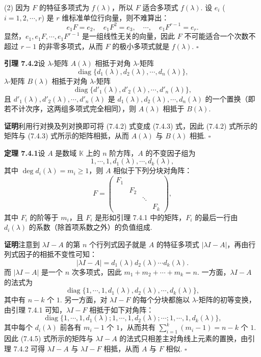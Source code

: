 \documentclass[UTF8,12pt,a4paper,fontset=fandol]{ctexart}
\begin{document}
(2) 因为 $F$ 的特征多项式为 $f(\lambda)$，所以 $F$ 适合多项式 $f(\lambda)$. 设 $e_i$ ($i=1,2,\cdots,r$) 是 $r$ 维标准单位行向量，则不难算出：
\[
e_1F=e_2,\quad e_1F^2=e_3,\quad \cdots,\quad e_1F^{r-1}=e_r.
\]
显然，$e_1,e_1F,\cdots,e_1F^{r-1}$ 是一组线性无关的向量，因此 $F$ 不可能适合一个次数不超过 $r-1$ 的非零多项式，从而 $F$ 的极小多项式就是 $f(\lambda)$. $\square$

\noindent\textbf{引理 7.4.2}\quad 设 $\lambda$-矩阵 $A(\lambda)$ 相抵于对角 $\lambda$-矩阵
\begin{equation}
\operatorname{diag}\{d_1(\lambda),d_2(\lambda),\cdots,d_n(\lambda)\},
\tag{7.4.2}
\end{equation}
$\lambda$-矩阵 $B(\lambda)$ 相抵于对角 $\lambda$-矩阵
\begin{equation}
\operatorname{diag}\{d'_1(\lambda),d'_2(\lambda),\cdots,d'_n(\lambda)\},
\tag{7.4.3}
\end{equation}
且 $d'_1(\lambda),d'_2(\lambda),\cdots,d'_n(\lambda)$ 是 $d_1(\lambda),d_2(\lambda),\cdots,d_n(\lambda)$ 的一个置换（即若不计次序，这两组多项式完全相同），则 $A(\lambda)$ 相抵于 $B(\lambda)$.

\noindent\textbf{证明}\quad 利用行对换及列对换即可将 (7.4.2) 式变成 (7.4.3) 式，因此 (7.4.2) 式所示的矩阵与 (7.4.3) 式所示的矩阵相抵，从而 $A(\lambda)$ 与 $B(\lambda)$ 相抵. $\square$

\noindent\textbf{定理 7.4.1}\quad 设 $A$ 是数域 $\mathbb{K}$ 上的 $n$ 阶方阵，$A$ 的不变因子组为
\[
1,\cdots,1,d_1(\lambda),\cdots,d_k(\lambda),
\]
其中 $\deg d_i(\lambda)=m_i\geq 1$，则 $A$ 相似于下列分块对角阵：
\begin{equation}
F=\left(\begin{array}{cccc}
F_1 & & & \\
& F_2 & & \\
& & \ddots & \\
& & & F_k
\end{array}\right),
\tag{7.4.4}
\end{equation}
其中 $F_i$ 的阶等于 $m_i$，且 $F_i$ 是形如引理 7.4.1 中的矩阵，$F_i$ 的最后一行由 $d_i(\lambda)$ 的系数（除首项系数之外）的负值组成.

\noindent\textbf{证明}\quad 注意到 $\lambda I-A$ 的第 $n$ 个行列式因子就是 $A$ 的特征多项式 $|\lambda I-A|$，再由行列式因子的相抵不变性可知：
\[
|\lambda I-A|=d_1(\lambda)d_2(\lambda)\cdots d_k(\lambda).
\]
而 $|\lambda I-A|$ 是一个 $n$ 次多项式，因此 $m_1+m_2+\cdots+m_k=n$. 一方面，$\lambda I-A$ 的法式为
\[
\operatorname{diag}\{1,\cdots,1,d_1(\lambda),d_2(\lambda),\cdots,d_k(\lambda)\},
\]
其中有 $n-k$ 个 $1$. 另一方面，对 $\lambda I-F$ 的每个分块都施以 $\lambda$-矩阵的初等变换，由引理 7.4.1 可知，$\lambda I-F$ 相抵于如下对角阵：
\begin{equation}
\operatorname{diag}\{1,\cdots,1,d_1(\lambda);1,\cdots,1,d_2(\lambda);\cdots;1,\cdots,1,d_k(\lambda)\},
\tag{7.4.5}
\end{equation}
其中每个 $d_i(\lambda)$ 前各有 $m_i-1$ 个 $1$，从而共有 $\sum_{i=1}^k(m_i-1)=n-k$ 个 $1$. 因此 (7.4.5) 式所示的矩阵与 $\lambda I-A$ 的法式只相差主对角线上元素的置换，由引理 7.4.2 可得 $\lambda I-A$ 与 $\lambda I-F$ 相抵，从而 $A$ 与 $F$ 相似. $\square$
\end{document}
